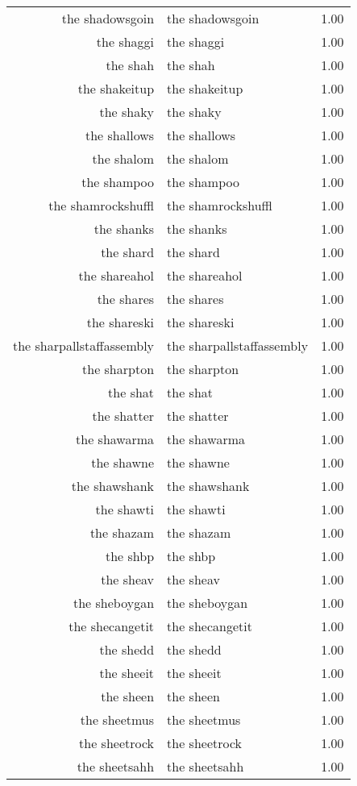 \begin{table}[ht]
\begin{tabular}{rlr}
  the shadowsgoin & the shadowsgoin & 1.00 \\ 
  the shaggi & the shaggi & 1.00 \\ 
  the shah & the shah & 1.00 \\ 
  the shakeitup & the shakeitup & 1.00 \\ 
  the shaky & the shaky & 1.00 \\ 
  the shallows & the shallows & 1.00 \\ 
  the shalom & the shalom & 1.00 \\ 
  the shampoo & the shampoo & 1.00 \\ 
  the shamrockshuffl & the shamrockshuffl & 1.00 \\ 
  the shanks & the shanks & 1.00 \\ 
  the shard & the shard & 1.00 \\ 
  the shareahol & the shareahol & 1.00 \\ 
  the shares & the shares & 1.00 \\ 
  the shareski & the shareski & 1.00 \\ 
  the sharpallstaffassembly & the sharpallstaffassembly & 1.00 \\ 
  the sharpton & the sharpton & 1.00 \\ 
  the shat & the shat & 1.00 \\ 
  the shatter & the shatter & 1.00 \\ 
  the shawarma & the shawarma & 1.00 \\ 
  the shawne & the shawne & 1.00 \\ 
  the shawshank & the shawshank & 1.00 \\ 
  the shawti & the shawti & 1.00 \\ 
  the shazam & the shazam & 1.00 \\ 
  the shbp & the shbp & 1.00 \\ 
  the sheav & the sheav & 1.00 \\ 
  the sheboygan & the sheboygan & 1.00 \\ 
  the shecangetit & the shecangetit & 1.00 \\ 
  the shedd & the shedd & 1.00 \\ 
  the sheeit & the sheeit & 1.00 \\ 
  the sheen & the sheen & 1.00 \\ 
  the sheetmus & the sheetmus & 1.00 \\ 
  the sheetrock & the sheetrock & 1.00 \\ 
  the sheetsahh & the sheetsahh & 1.00 \\ 

\end{tabular}
\end{table}
